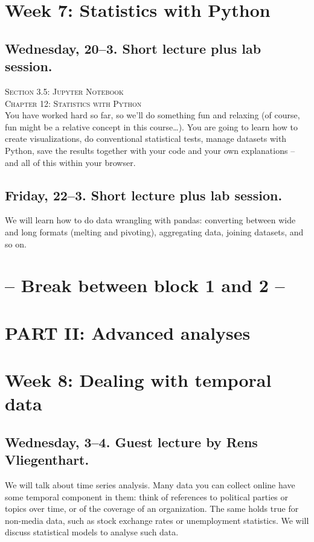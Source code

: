 \section*{Week 7: Statistics with Python}

\subsection*{Wednesday, 20--3. Short lecture plus lab session.}
\textsc{ Section 3.5: Jupyter Notebook}\\
\textsc{ Chapter 12: Statistics with Python}\\
You have worked hard so far, so we'll do something fun and relaxing (of course, fun might be a relative concept in this course\ldots). You are going to learn how to create visualizations, do conventional statistical tests, manage datasets with Python, save the results together with your code and your own explanations -- and all of this within your browser.



\subsection*{Friday, 22--3.  Short lecture plus lab session.}
We will learn how to do data wrangling with pandas: converting between wide and long formats (melting and pivoting), aggregating data, joining datasets, and so on.


\section*{-- Break between block 1 and 2 -- }

\section*{PART II: Advanced analyses}


\section*{Week 8: Dealing with temporal data}

\subsection*{Wednesday, 3--4. Guest lecture by Rens Vliegenthart.}
We will talk about time series analysis. Many data you can collect online have some temporal component in them: think of references to political parties or topics over time, or of the coverage of an organization. The same holds true for non-media data, such as stock exchange rates or unemployment statistics. We will discuss statistical models to analyse such data.


